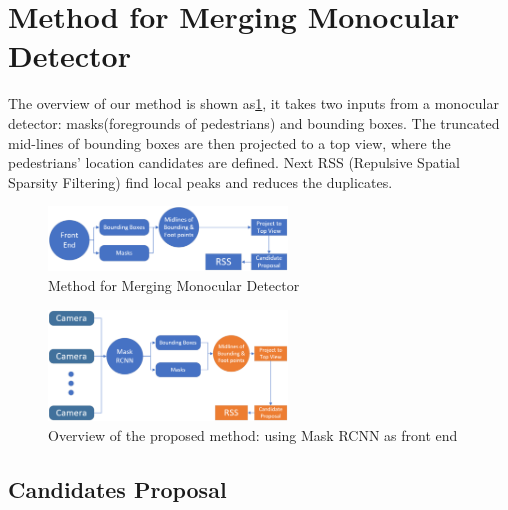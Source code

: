 \documentclass[journal]{IEEEtran}
\begin{document}




\section{Method for Merging Monocular Detector}
The overview of our method is shown as\ref{fig:overview1}, it takes two inputs from a monocular detector: masks(foregrounds of pedestrians) and bounding boxes. The truncated mid-lines of bounding boxes are then projected to a top view, where the pedestrians' location candidates are defined. Next RSS (Repulsive Spatial Sparsity Filtering) find local peaks and reduces the duplicates.


\begin{figure}[H]
    \centering
    \includegraphics[width=2.5in]{fig/overall2.eps}
    \caption{Method for Merging Monocular Detector}
    \label{fig:overview1}
\end{figure}
\begin{figure}[H]
    \centering
    \includegraphics[width=2.5in]{fig/overall.eps}
    \caption{Overview of the proposed method: using Mask RCNN as front end}
    \label{}
\end{figure}



\subsection{Candidates Proposal}
\end{document}
